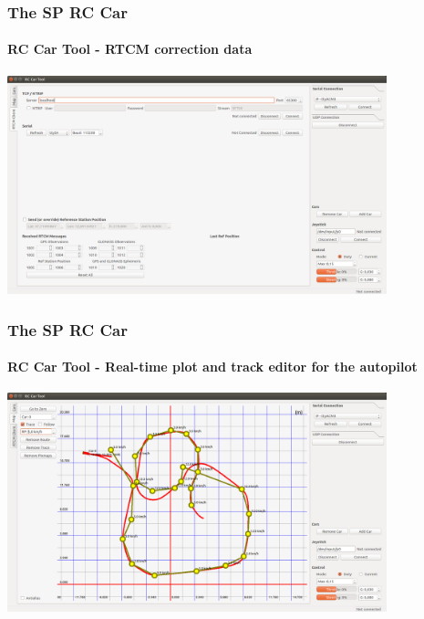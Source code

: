 \documentclass[aspectratio=169,electronics,notopline]{beamer}
\begin{document}
\begin{frame} 
\frametitle{The SP RC Car}
\framesubtitle{RC Car Tool - RTCM correction data}
\begin{center}
	\includegraphics[width=11cm]{Figures/GUI/car_rtcm.png}
\end{center}
\end{frame}

\begin{frame} 
\frametitle{The SP RC Car}
\framesubtitle{RC Car Tool - Real-time plot and track editor for the autopilot}
\begin{center}
	\includegraphics[width=11cm]{Figures/GUI/car_map.png}
\end{center}
\end{frame}

\spEndFrame
\end{document}
